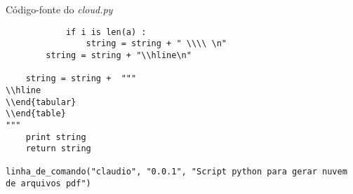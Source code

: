 \begin{example}{Código-fonte do \emph{cloud.py}}
\begin{verbatim}
            if i is len(a) :
                string = string + " \\\\ \n"
        string = string + "\\hline\n"
            
    string = string +  """
\\hline
\\end{tabular}
\\end{table}
"""
    print string
    return string
    
linha_de_comando("claudio", "0.0.1", "Script python para gerar nuvem de arquivos pdf")


\end{verbatim}
\end{example} 